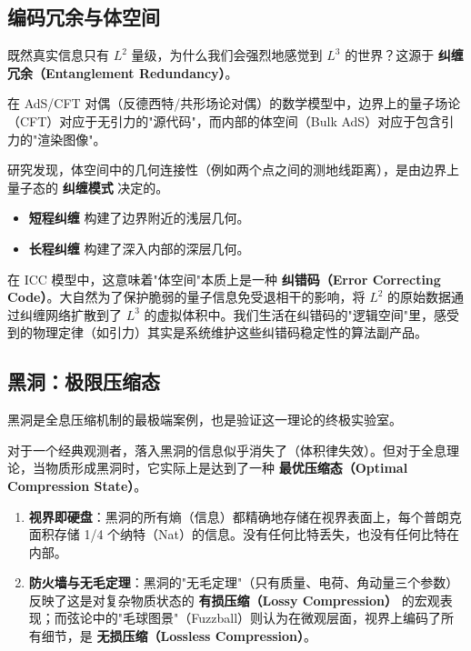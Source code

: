 \subsection{编码冗余与体空间}

既然真实信息只有 $L^2$ 量级，为什么我们会强烈地感觉到 $L^3$ 的世界？这源于 \textbf{纠缠冗余（Entanglement Redundancy）}。

在 AdS/CFT 对偶（反德西特/共形场论对偶）的数学模型中，边界上的量子场论（CFT）对应于无引力的"源代码"，而内部的体空间（Bulk AdS）对应于包含引力的"渲染图像"。

研究发现，体空间中的几何连接性（例如两个点之间的测地线距离），是由边界上量子态的 \textbf{纠缠模式} 决定的。

\begin{itemize}
\item \textbf{短程纠缠} 构建了边界附近的浅层几何。

\item \textbf{长程纠缠} 构建了深入内部的深层几何。
\end{itemize}

在 ICC 模型中，这意味着"体空间"本质上是一种 \textbf{纠错码（Error Correcting Code）}。大自然为了保护脆弱的量子信息免受退相干的影响，将 $L^2$ 的原始数据通过纠缠网络扩散到了 $L^3$ 的虚拟体积中。我们生活在纠错码的"逻辑空间"里，感受到的物理定律（如引力）其实是系统维护这些纠错码稳定性的算法副产品。

\subsection{黑洞：极限压缩态}

黑洞是全息压缩机制的最极端案例，也是验证这一理论的终极实验室。

对于一个经典观测者，落入黑洞的信息似乎消失了（体积律失效）。但对于全息理论，当物质形成黑洞时，它实际上是达到了一种 \textbf{最优压缩态（Optimal Compression State）}。

\begin{enumerate}
\item \textbf{视界即硬盘}：黑洞的所有熵（信息）都精确地存储在视界表面上，每个普朗克面积存储 1/4 个纳特（Nat）的信息。没有任何比特丢失，也没有任何比特在内部。

\item \textbf{防火墙与无毛定理}：黑洞的"无毛定理"（只有质量、电荷、角动量三个参数）反映了这是对复杂物质状态的 \textbf{有损压缩（Lossy Compression）} 的宏观表现；而弦论中的"毛球图景"（Fuzzball）则认为在微观层面，视界上编码了所有细节，是 \textbf{无损压缩（Lossless Compression）}。
\end{enumerate}

